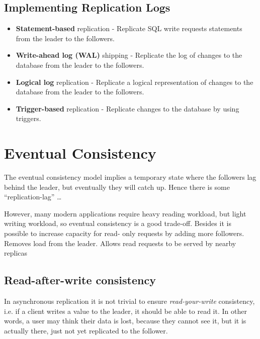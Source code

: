 \subsection{Implementing Replication Logs}
\begin{itemize}
   \item \textbf{Statement-based} replication - Replicate SQL write requests statements from the leader to the followers.
   \item \textbf{Write-ahead log (WAL)} shipping - Replicate the log of changes to the database from the leader to the followers.
   \item \textbf{Logical log} replication - Replicate a logical representation of changes to the database from the leader to the followers.
   \item \textbf{Trigger-based} replication - Replicate changes to the database by using triggers.
\end{itemize}


\section{Eventual Consistency}
The eventual consistency model implies a temporary state where the followers lag behind the leader, but eventually they will catch up. 
Hence there is some ``replication-lag'' \dots

However, many modern applications require heavy reading workload, but light writing workload, so eventual consistency is a good trade-off.
Besides it is possible to increase capacity for read- only requests by adding more followers. Removes load from the leader. Allows read requests to be served by nearby replicas 

\subsection{Read-after-write consistency}
In asynchronous replication it is not trivial to ensure \textit{read-your-write} consistency, i.e. if a client writes a value to the leader, it should be able to read it.
In other words, a user may think their data is lost, because they cannot see it, but it is actually there, just not yet replicated to the follower.

